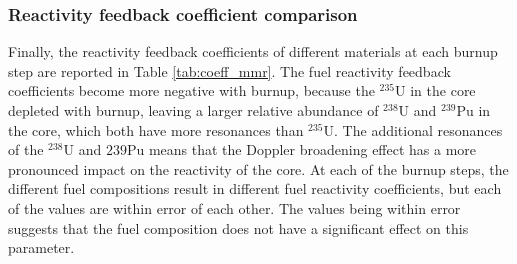 \subsubsection{Reactivity feedback coefficient comparison}
Finally, the reactivity feedback coefficients of different materials 
at each burnup step are reported in Table \ref{tab:coeff_mmr}. The 
fuel reactivity feedback coefficients become more negative with 
burnup, because the $^{235}$U in the core depleted with burnup, 
leaving a larger relative abundance of $^{238}$U and $^{239}$Pu in 
the core, which both have more resonances than $^{235}$U. The 
additional resonances of the $^{238}$U and ${239}$Pu means that the 
Doppler broadening effect has a more pronounced impact on the reactivity 
of the core. At each of the burnup steps, the different fuel compositions 
result in different fuel reactivity coefficients, but each of the values 
are within error of each other. The values being within error suggests 
that the fuel composition does not have a significant effect on 
this parameter. 

